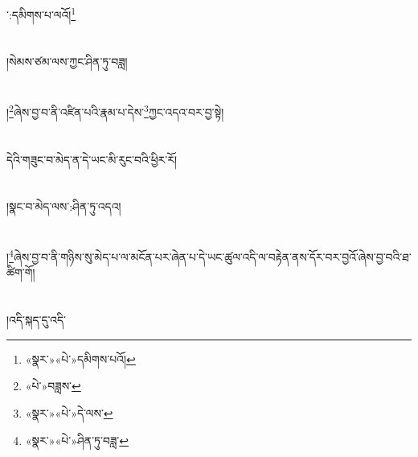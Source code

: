 ་:དམིགས་པ་ལའོ།\footnote{«སྣར་»«པེ་»དམིགས་པའོ།}\chapter{ }།སེམས་ཙམ་ལས་ཀྱང་ཤིན་ཏུ་བཟླ།\chapter{ }།\footnote{«པེ་»བཟླས་}ཞེས་བྱ་བ་ནི་འཛིན་པའི་རྣམ་པ་དེས་\footnote{«སྣར་»«པེ་»དེ་ལས་}ཀྱང་འདའ་བར་བྱ་སྟེ།\chapter{ }དེའི་གཟུང་བ་མེད་ན་དེ་ཡང་མི་རུང་བའི་ཕྱིར་རོ།\chapter{ }།སྣང་བ་མེད་ལས་:ཤིན་ཏུ་འདའ།\chapter{ }།\footnote{«སྣར་»«པེ་»ཤིན་ཏུ་བཟླ་}ཞེས་བྱ་བ་ནི་གཉིས་སུ་མེད་པ་ལ་མངོན་པར་ཞེན་པ་དེ་ཡང་ཚུལ་འདི་ལ་བརྟེན་ནས་དོར་བར་བྱའོ་ཞེས་བྱ་བའི་ཐ་ཚིག་གོ།\chapter{ }།འདི་སྐད་དུ་འདི་
